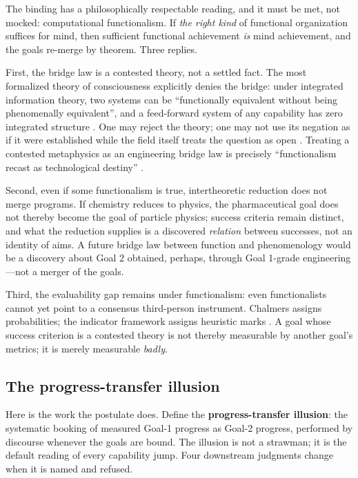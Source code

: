 \documentclass[10pt]{article}
\begin{document}
The binding has a philosophically respectable reading, and it must be met, not mocked: computational functionalism. If \emph{the right kind} of functional organization suffices for mind, then sufficient functional achievement \emph{is} mind achievement, and the goals re-merge by theorem. Three replies.

First, the bridge law is a contested theory, not a settled fact. The most formalized theory of consciousness explicitly denies the bridge: under integrated information theory, two systems can be ``functionally equivalent without being phenomenally equivalent'', and a feed-forward system of any capability has zero integrated structure \cite{findlay2024dissociating,albantakis2023iit}. One may reject the theory; one may not use its negation as if it were established while the field itself treats the question as open \cite{butlin2023consciousness}. Treating a contested metaphysics as an engineering bridge law is precisely ``functionalism recast as technological destiny'' \cite{jorge2026harsh}.

Second, even if some functionalism is true, intertheoretic reduction does not merge programs. If chemistry reduces to physics, the pharmaceutical goal does not thereby become the goal of particle physics; success criteria remain distinct, and what the reduction supplies is a discovered \emph{relation} between successes, not an identity of aims. A future bridge law between function and phenomenology would be a discovery about Goal 2 obtained, perhaps, through Goal 1-grade engineering---not a merger of the goals.

Third, the evaluability gap remains under functionalism: even functionalists cannot yet point to a consensus third-person instrument. Chalmers assigns probabilities; the indicator framework assigns heuristic marks \cite{chalmers2023llm,butlin2023consciousness}. A goal whose success criterion is a contested theory is not thereby measurable by another goal's metrics; it is merely measurable \emph{badly}.

\subsection{The progress-transfer illusion}\label{sec:illusion}

Here is the work the postulate does. Define the \textbf{progress-transfer illusion}: the systematic booking of measured Goal-1 progress as Goal-2 progress, performed by discourse whenever the goals are bound. The illusion is not a strawman; it is the default reading of every capability jump. Four downstream judgments change when it is named and refused.
\end{document}
